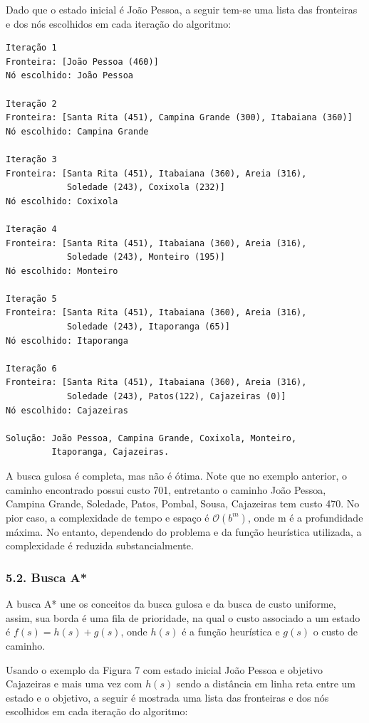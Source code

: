 \documentclass[brazil,]{article}
\begin{document}
Dado que o estado inicial é João Pessoa, a seguir tem-se uma lista das
fronteiras e dos nós escolhidos em cada iteração do algoritmo:

\begin{verbatim}
Iteração 1
Fronteira: [João Pessoa (460)]
Nó escolhido: João Pessoa

Iteração 2
Fronteira: [Santa Rita (451), Campina Grande (300), Itabaiana (360)]
Nó escolhido: Campina Grande

Iteração 3
Fronteira: [Santa Rita (451), Itabaiana (360), Areia (316),
            Soledade (243), Coxixola (232)]
Nó escolhido: Coxixola

Iteração 4
Fronteira: [Santa Rita (451), Itabaiana (360), Areia (316),
            Soledade (243), Monteiro (195)]
Nó escolhido: Monteiro

Iteração 5
Fronteira: [Santa Rita (451), Itabaiana (360), Areia (316),
            Soledade (243), Itaporanga (65)]
Nó escolhido: Itaporanga

Iteração 6
Fronteira: [Santa Rita (451), Itabaiana (360), Areia (316),
            Soledade (243), Patos(122), Cajazeiras (0)]
Nó escolhido: Cajazeiras

Solução: João Pessoa, Campina Grande, Coxixola, Monteiro,
         Itaporanga, Cajazeiras.
\end{verbatim}

A busca gulosa é completa, mas não é ótima. Note que no exemplo
anterior, o caminho encontrado possui custo 701, entretanto o caminho
João Pessoa, Campina Grande, Soledade, Patos, Pombal, Sousa, Cajazeiras
tem custo 470. No pior caso, a complexidade de tempo e espaço é
\(\mathcal{O}(b^m)\), onde m é a profundidade máxima. No entanto,
dependendo do problema e da função heurística utilizada, a complexidade
é reduzida substancialmente.

\subsubsection{5.2. Busca A*}\label{busca-a}

A busca A* une os conceitos da busca gulosa e da busca de custo
uniforme, assim, sua borda é uma fila de prioridade, na qual o custo
associado a um estado é \(f(s) = h(s) + g(s)\), onde \(h(s)\) é a função
heurística e \(g(s)\) o custo de caminho.

Usando o exemplo da Figura 7 com estado inicial João Pessoa e objetivo
Cajazeiras e mais uma vez com \(h(s)\) sendo a distância em linha reta
entre um estado e o objetivo, a seguir é mostrada uma lista das
fronteiras e dos nós escolhidos em cada iteração do algoritmo:
\end{document}
